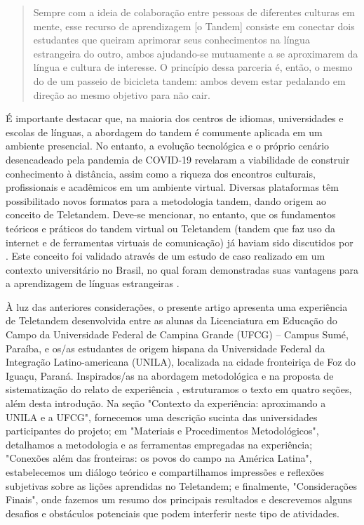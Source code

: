 \documentclass[portuguese]{textolivre}
\begin{document}
\begin{quote}
 Sempre com a ideia de colaboração entre pessoas de diferentes culturas em mente, esse recurso de aprendizagem [o Tandem] consiste em conectar dois estudantes que queiram aprimorar seus conhecimentos na língua estrangeira do outro, ambos ajudando-se mutuamente a se aproximarem da língua e cultura de interesse. O princípio dessa parceria é, então, o mesmo do de um passeio de bicicleta tandem: ambos devem estar pedalando em direção ao mesmo objetivo para não cair.
\end{quote}

É importante destacar que, na maioria dos centros de idiomas, universidades e escolas de línguas, a abordagem do tandem é comumente aplicada em um ambiente presencial. No entanto, a evolução tecnológica e o próprio cenário desencadeado pela pandemia de COVID-19 revelaram a viabilidade de construir conhecimento à distância, assim como a riqueza dos encontros culturais, profissionais e acadêmicos em um ambiente virtual. Diversas plataformas têm possibilitado novos formatos para a metodologia tandem, dando origem ao conceito de Teletandem. Deve-se mencionar, no entanto, que os fundamentos teóricos e práticos do tandem virtual ou Teletandem (tandem que faz uso da internet e de ferramentas virtuais de comunicação) já haviam sido discutidos por \textcite{vassallo2006foreign}. Este conceito foi validado através de um estudo de caso realizado em um contexto universitário no Brasil, no qual foram demonstradas suas vantagens para a aprendizagem de línguas estrangeiras \cite{vassallo2006foreign}.

À luz das anteriores considerações, o presente artigo apresenta uma experiência de Teletandem desenvolvida entre as alunas da Licenciatura em Educação do Campo da Universidade Federal de Campina Grande (UFCG) – Campus Sumé, Paraíba, e os/as estudantes de origem hispana da Universidade Federal da Integração Latino-americana (UNILA), localizada na cidade fronteiriça de Foz do Iguaçu, Paraná. Inspirados/as na abordagem metodológica e na proposta de sistematização do relato de experiência \cite{mussi_pressupostos_2021}, estruturamos o texto em quatro seções, além desta introdução. Na seção "Contexto da experiência: aproximando a UNILA e a UFCG", fornecemos uma descrição sucinta das universidades participantes do projeto; em "Materiais e Procedimentos Metodológicos", detalhamos a metodologia e as ferramentas empregadas na experiência; "Conexões além das fronteiras: os povos do campo na América Latina", estabelecemos um diálogo teórico e compartilhamos impressões e reflexões subjetivas sobre as lições aprendidas no Teletandem; e finalmente, "Considerações Finais", onde fazemos um resumo dos principais resultados e descrevemos alguns desafios e obstáculos potenciais que podem interferir neste tipo de atividades.
\end{document}
